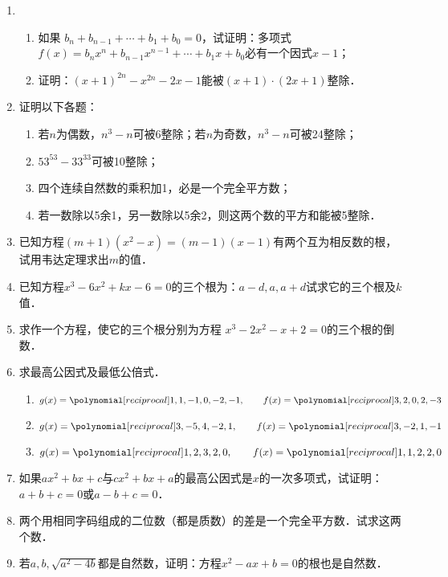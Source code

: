 \begin{enumerate}
\item 
\begin{enumerate}
\item 如果 $b_n+b_{n-1}+\cdots+b_1+b_0=0$，试证明：多项式$f(x)=b_nx^n+b_{n-1}x^{n-1}+\cdots+b_1x+b_0$必有一个因式$x-1$；
\item 证明：$(x+1)^{2n}-x^{2n}-2x-1$能被$(x+1)\cdot (2x+1)$整除．
\end{enumerate}

\item 证明以下各题：
\begin{enumerate}
    \item 若$n$为偶数，$n^3-n$可被6整除；若$n$为奇数，$n^3-n$可被24整除；
    \item $53^{53}-33^{33}$可被10整除；
    \item 四个连续自然数的乘积加1，必是一个完全平方数；
    \item 若一数除以5余1，另一数除以5余2，则这两个数的平方和能被5整除．
\end{enumerate}

\item 已知方程$(m+1)(x^2-x)=(m-1)(x-1)$有两个互为相反数的根，试用韦达定理求出$m$的值．
\item 已知方程$x^3-6x^2+kx-6=0$的三个根为：$a-d,a,a+d$试求它的三个根及$k$值．
\item 求作一个方程，使它的三个根分别为方程 $x^3-2x^2-x+2=0$的三个根的倒数．

\item 求最高公因式及最低公倍式．
\begin{enumerate}
    \item $g(x)=\poly{1,1,-1,0,-2,-1},\qquad f(x)=\poly{3,2,0,2,-3}$
    \item $g(x)=\poly{3,-5,4,-2,1},\qquad f(x)=\poly{3,-2,1,-1}$
    \item $g(x)=\poly{1,2,3,2,0},\qquad f(x)=\poly{1,1,2,2,0}$
\end{enumerate}


\item 如果$ax^2+bx+c$与$cx^2+bx+a$的最高公因式是$x$的一次多项式，试证明：
$a+b+c=0$或$a-b+c=0$．
\item 两个用相同字码组成的二位数（都是质数）的差是一个完全平方数．试求这两个数．
\item 若$a,b,\sqrt{a^2-4b}$都是自然数，证明：方程$x^2-ax+b=0$的根也是自然数．

\end{enumerate}


